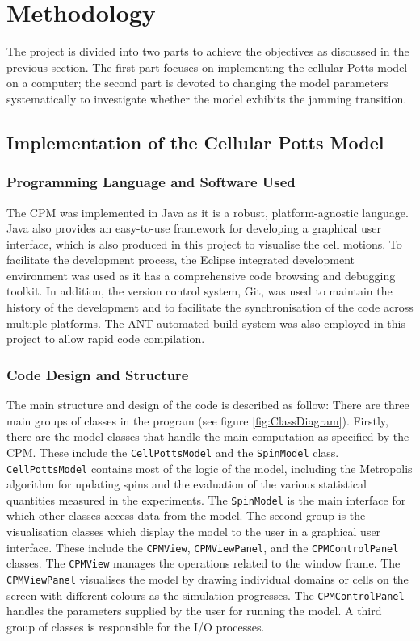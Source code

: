 \documentclass[a4paper,12pt]{article}
\begin{document}
\section{Methodology}
The project is divided into two parts to achieve the objectives as discussed in the previous section. The first part focuses on implementing the cellular Potts model on a computer; the second part is devoted to changing the model parameters systematically to investigate whether the model exhibits the jamming transition.

\subsection{Implementation of the Cellular Potts Model}
\subsubsection{Programming Language and Software Used}
The CPM was implemented in Java as it is a robust, platform-agnostic language. Java also provides an easy-to-use framework for developing a graphical user interface, which is also produced in this project to visualise the cell motions. To facilitate the development process, the Eclipse integrated development environment was used as it has a comprehensive code browsing and debugging toolkit. In addition, the version control system, Git, was used to maintain the history of the development and to facilitate the synchronisation of the code across multiple platforms. The ANT automated build system was also employed in this project to allow rapid code compilation.

\subsubsection{Code Design and Structure}
The main structure and design of the code is described as follow: There are three main groups of classes in the program (see figure \ref{fig:ClassDiagram}). Firstly, there are the model classes that handle the main computation as specified by the CPM. These include the \texttt{CellPottsModel} and the \texttt{SpinModel} class. \texttt{CellPottsModel} contains most of the logic of the model, including the Metropolis algorithm for updating spins and the evaluation of the various statistical quantities measured in the experiments. The \texttt{SpinModel} is the main interface for which other classes access data from the model. The second group is the visualisation classes which display the model to the user in a graphical user interface. These include the \texttt{CPMView}, \texttt{CPMViewPanel}, and the \texttt{CPMControlPanel} classes. The \texttt{CPMView} manages the operations related to the window frame. The \texttt{CPMViewPanel} visualises the model by drawing individual domains or cells on the screen with different colours as the simulation progresses. The \texttt{CPMControlPanel} handles the parameters supplied by the user for running the model.  A third group of classes is responsible for the I/O processes. 
\end{document}
